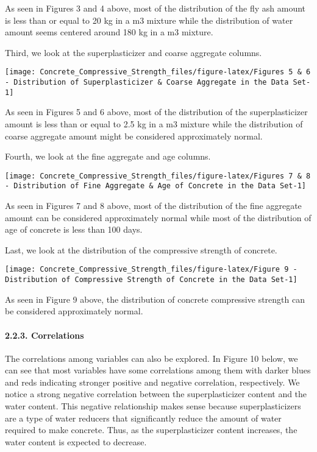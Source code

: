 \documentclass[
]{article}
\begin{document}
As seen in Figures 3 and 4 above, most of the distribution of the fly
ash amount is less than or equal to 20 kg in a m3 mixture while the
distribution of water amount seems centered around 180 kg in a m3
mixture.

Third, we look at the superplasticizer and coarse aggregate columns.

\begin{center}\texttt{[image: Concrete\_Compressive\_Strength\_files/figure-latex/Figures 5 \& 6 - Distribution of Superplasticizer \& Coarse Aggregate in the Data Set-1]} \end{center}

As seen in Figures 5 and 6 above, most of the distribution of the
superplasticizer amount is less than or equal to 2.5 kg in a m3 mixture
while the distribution of coarse aggregate amount might be considered
approximately normal.

Fourth, we look at the fine aggregate and age columns.

\begin{center}\texttt{[image: Concrete\_Compressive\_Strength\_files/figure-latex/Figures 7 \& 8 - Distribution of Fine Aggregate \& Age of Concrete in the Data Set-1]} \end{center}

As seen in Figures 7 and 8 above, most of the distribution of the fine
aggregate amount can be considered approximately normal while most of
the distribution of age of concrete is less than 100 days.

Last, we look at the distribution of the compressive strength of
concrete.

\begin{center}\texttt{[image: Concrete\_Compressive\_Strength\_files/figure-latex/Figure 9 - Distribution of Compressive Strength of Concrete in the Data Set-1]} \end{center}

As seen in Figure 9 above, the distribution of concrete compressive
strength can be considered approximately normal.

\hypertarget{correlations}{%
\paragraph{2.2.3. Correlations}\label{correlations}}

\hfill\break
The correlations among variables can also be explored. In Figure 10
below, we can see that most variables have some correlations among them
with darker blues and reds indicating stronger positive and negative
correlation, respectively. We notice a strong negative correlation
between the superplasticizer content and the water content. This
negative relationship makes sense because superplasticizers are a type
of water reducers that significantly reduce the amount of water required
to make concrete. Thus, as the superplasticizer content increases, the
water content is expected to decrease.
\end{document}
